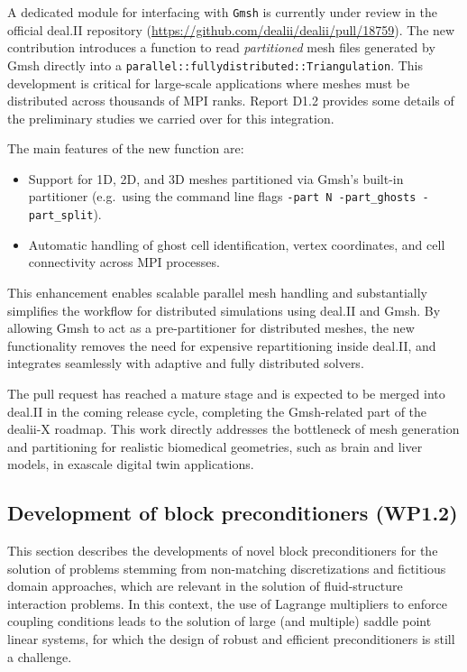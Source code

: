 \documentclass[a4paper,12pt]{article}
\begin{document}
A dedicated module for interfacing with \texttt{Gmsh} is currently under
review in the official deal.II repository
(\url{https://github.com/dealii/dealii/pull/18759}).  
The new contribution introduces a function to read \emph{partitioned} mesh files
generated by Gmsh directly into a \texttt{parallel::fullydistributed::Triangulation}.
This development is critical for large-scale applications where meshes must be
distributed across thousands of MPI ranks. Report D1.2 provides some details of the preliminary studies we carried over for this integration.

The main features of the new function are:
\begin{itemize}
  \item Support for 1D, 2D, and 3D meshes partitioned via Gmsh's built-in
        partitioner (e.g.\ using the command line flags
        \verb|-part N -part_ghosts -part_split|).
  \item Automatic handling of ghost cell identification, vertex coordinates,
        and cell connectivity across MPI processes.
\end{itemize}

This enhancement enables scalable parallel mesh handling and substantially
simplifies the workflow for distributed simulations using deal.II and Gmsh.
By allowing Gmsh to act as a pre-partitioner for distributed meshes, the new
functionality removes the need for expensive repartitioning inside deal.II,
and integrates seamlessly with adaptive and fully distributed solvers.  

The pull request has reached a mature stage and is expected to be merged into
deal.II in the coming release cycle, completing the Gmsh-related part of the
dealii-X roadmap. This work directly addresses the bottleneck of mesh generation
and partitioning for realistic biomedical geometries, such as brain and liver
models, in exascale digital twin applications.


\subsection{Development of block preconditioners (WP1.2)}
\label{sec:preconditioning}
This section describes the developments of novel block preconditioners for the solution of problems stemming from
non-matching discretizations and fictitious domain approaches, which are relevant in the solution
of fluid-structure interaction problems. In this context, the use of Lagrange multipliers to enforce coupling conditions
leads to the solution of large (and multiple) saddle point linear systems, for which the design of robust and
efficient preconditioners is still a challenge.
\end{document}
